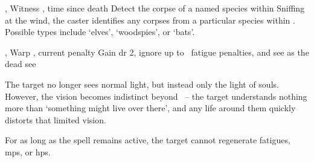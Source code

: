   {\mFate, \mAir}%
  {Witness}%
  {\distant, \detailed}%
  {time since death}%
  {Detect the corpse of a named species within \spellRange}%
  {
    Sniffing at the wind, the caster identifies any corpses from a particular species within \spellRange.
    Possible types include `elves', `woodspies', or `bats'.
  }

  {\mFate, \mAir}%
  {Warp}%
  {\distant, \detailed}%
  {current  penalty}%
  {Gain \gls{dr} 2, ignore up to ~\gls{fatigue} penalties, and see as the dead see}%
  {
    The target no longer sees normal light, but instead only the light of souls.
    However, the vision becomes indistinct beyond \spellRange\ -- the target understands nothing more than `something might live over there', and any life around them quickly distorts that limited vision.

    For as long as the spell remains active, the target cannot regenerate \glspl{fatigue}, \glspl{mp}, or \glspl{hp}.
  }

